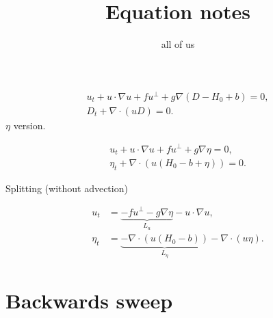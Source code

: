 \documentclass{article}
\begin{document}
\title{Equation notes}
\author{all of us}
\maketitle

\begin{align}
  u_t + u\cdot\nabla u + fu^{\perp} + g\nabla (D-H_0+b) = 0, \\
  D_t + \nabla\cdot (uD) = 0.
\end{align}
$\eta$ version.

\begin{align}
  u_t + u\cdot\nabla u + fu^{\perp} + g\nabla \eta = 0, \\
  \eta_t + \nabla\cdot (u(H_0-b+\eta)) = 0.
\end{align}

Splitting (without advection)

\begin{align}
  u_t &= \underbrace{- fu^{\perp} - g\nabla \eta}_{L_u} -u\cdot\nabla u, \\
  \eta_t &=\underbrace{- \nabla\cdot (u(H_0-b))}_{L_\eta} -\nabla\cdot (u\eta).
\end{align}

\section{Backwards sweep}
\end{document}
